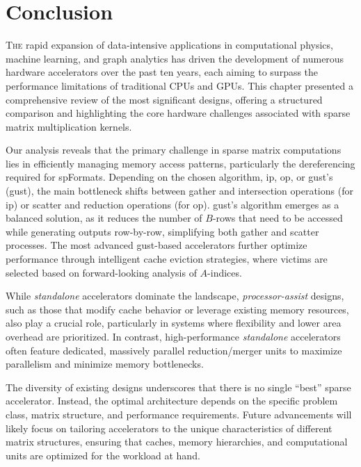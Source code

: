
\section{Conclusion}
\label{sec:soa:conclu}

\lettrine{T}{he} rapid expansion of data-intensive applications in computational physics, machine learning, and graph analytics has driven the development of numerous hardware accelerators over the past ten years, each aiming to surpass the performance limitations of traditional CPUs and GPUs.
This chapter presented a comprehensive review of the most significant designs, offering a structured comparison and highlighting the core hardware challenges associated with sparse matrix multiplication kernels.

Our analysis reveals that the primary challenge in sparse matrix computations lies in efficiently managing memory access patterns, particularly the dereferencing required for \glspl{spFormat}.
Depending on the chosen algorithm, \acrfull{ip}, \acrfull{op}, or \acrlong{gust}'s (\acrshort{gust}), the main bottleneck shifts between \gls{gather} and \gls{intersection} operations (for \acrshort{ip}) or \gls{scatter} and \gls{reduction} operations (for \acrshort{op}).
\acrlong{gust}'s algorithm emerges as a balanced solution, as it reduces the number of $B$-rows that need to be accessed while generating outputs row-by-row, simplifying both \gls{gather} and \gls{scatter} processes.
The most advanced \acrlong{gust}-based accelerators further optimize performance through intelligent cache \gls{eviction} strategies, where victims are selected based on forward-looking analysis of $A$-indices.

While \textit{standalone} accelerators dominate the landscape, \textit{processor-assist} designs, such as those that modify cache behavior or leverage existing memory resources, also play a crucial role, particularly in systems where flexibility and lower area overhead are prioritized.
In contrast, high-performance \textit{standalone} accelerators often feature dedicated, massively parallel \gls{reduction}/merger units to maximize parallelism and minimize memory bottlenecks.

The diversity of existing designs underscores that there is no single ``best'' sparse accelerator.
Instead, the optimal architecture depends on the specific problem class, matrix structure, and performance requirements.
Future advancements will likely focus on tailoring accelerators to the unique characteristics of different matrix structures, ensuring that caches, memory hierarchies, and computational units are optimized for the workload at hand.

